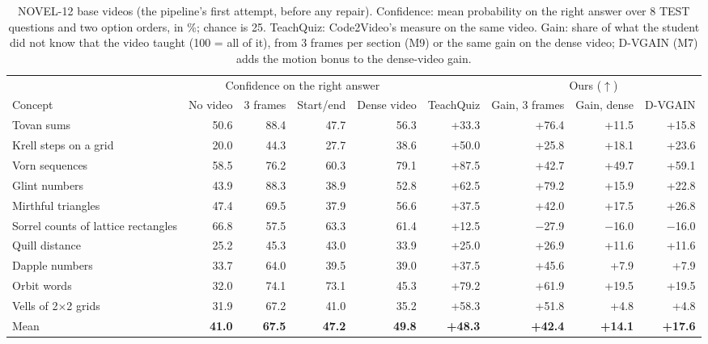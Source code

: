 \begin{table}[!tbp]\centering\footnotesize\setlength{\tabcolsep}{4pt}
\caption{NOVEL-12 base videos (the pipeline's first attempt, before any repair). Confidence: mean probability on the right answer over 8 TEST questions and two option orders, in \%; chance is 25. TeachQuiz: Code2Video's measure on the same video. Gain: share of what the student did not know that the video taught (100 = all of it), from 3 frames per section (M9) or the same gain on the dense video; D-VGAIN (M7) adds the motion bonus to the dense-video gain.}\label{tab:novel_first}
\begin{adjustbox}{max width=\linewidth}\begin{tabular}{lrrrrrrrr}\toprule & \multicolumn{4}{c}{Confidence on the right answer} & & \multicolumn{3}{c}{Ours ($\uparrow$)}\\
\cmidrule(lr){2-5}\cmidrule(lr){7-9}
Concept & No video & 3 frames & Start/end & Dense video & TeachQuiz & Gain, 3 frames & Gain, dense & D-VGAIN\\\midrule
Tovan sums & 50.6 & 88.4 & 47.7 & 56.3 & +33.3 & +76.4 & +11.5 & +15.8 \\
Krell steps on a grid & 20.0 & 44.3 & 27.7 & 38.6 & +50.0 & +25.8 & +18.1 & +23.6 \\
Vorn sequences & 58.5 & 76.2 & 60.3 & 79.1 & +87.5 & +42.7 & +49.7 & +59.1 \\
Glint numbers & 43.9 & 88.3 & 38.9 & 52.8 & +62.5 & +79.2 & +15.9 & +22.8 \\
Mirthful triangles & 47.4 & 69.5 & 37.9 & 56.6 & +37.5 & +42.0 & +17.5 & +26.8 \\
Sorrel counts of lattice rectangles & 66.8 & 57.5 & 63.3 & 61.4 & +12.5 & $-$27.9 & $-$16.0 & $-$16.0 \\
Quill distance & 25.2 & 45.3 & 43.0 & 33.9 & +25.0 & +26.9 & +11.6 & +11.6 \\
Dapple numbers & 33.7 & 64.0 & 39.5 & 39.0 & +37.5 & +45.6 & +7.9 & +7.9 \\
Orbit words & 32.0 & 74.1 & 73.1 & 45.3 & +79.2 & +61.9 & +19.5 & +19.5 \\
Vells of 2×2 grids & 31.9 & 67.2 & 41.0 & 35.2 & +58.3 & +51.8 & +4.8 & +4.8 \\
\midrule
Mean & \textbf{41.0} & \textbf{67.5} & \textbf{47.2} & \textbf{49.8} & \textbf{+48.3} & \textbf{+42.4} & \textbf{+14.1} & \textbf{+17.6} \\
\bottomrule\end{tabular}\end{adjustbox}
\end{table}
